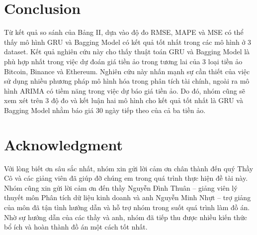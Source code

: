 \documentclass[conference]{IEEEtran}
\begin{document}
\section{Conclusion}
Từ kết quả so sánh của Bảng II, dựa vào độ đo RMSE, MAPE và MSE có thể thấy mô hình GRU và Bagging Model có kết quả tốt nhất trong các mô hình ở 3 dataset. Kết quả nghiên cứu này cho thấy thuật toán GRU và Bagging Model là phù hợp nhất trong việc dự đoán giá tiền ảo trong tương lai của 3 loại tiền ảo Bitcoin, Binance và Ethereum. Nghiên cứu này nhấn mạnh sự cần thiết của việc sử dụng nhiều phương pháp mô hình hóa trong phân tích tài chính, ngoài ra mô hình ARIMA có tiềm năng trong việc dự báo giá tiền ảo. Do đó, nhóm cũng sẽ xem xét trên 3 độ đo và kết luận hai mô hình cho kết quả tốt nhất là GRU và Bagging Model nhằm báo giá 30 ngày tiếp theo của cả ba tiền ảo.
\section*{Acknowledgment}
Với lòng biết ơn sâu sắc nhất, nhóm xin gửi lời cảm ơn chân thành đến quý Thầy Cô và các giảng viên đã giúp đỡ chúng em trong quá trình thực hiện đề tài này. Nhóm cũng xin gửi lời cảm ơn đến thầy Nguyễn Đình Thuân – giảng viên lý thuyết môn Phân tích dữ liệu kinh doanh và anh Nguyễn Minh Nhựt – trợ giảng của môn đã tận tình hướng dẫn và hỗ trợ nhóm trong suốt quá trình làm đồ án. Nhờ sự hướng dẫn của các thầy và anh, nhóm đã tiếp thu được nhiều kiến thức bổ ích và hoàn thành đồ án một cách tốt nhất.
\clearpage
\end{document}
